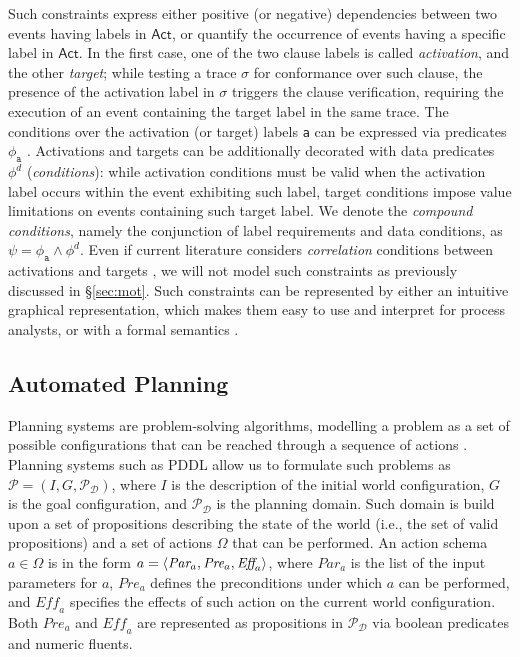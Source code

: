  Such constraints express either positive (or negative) dependencies between two events having labels in $\textsf{Act}$, or quantify the occurrence of events having a specific label in $\textsf{Act}$. In the first case, one of the two clause labels is called \textit{activation}, and the other \textit{target}; while testing a trace $\sigma$ for conformance over such clause, the presence of the activation label in $\sigma$ triggers the clause verification, requiring the execution of an event containing the target label in the same trace. The conditions over the activation (or target) labels \texttt{a} can be expressed via predicates $\phi_{\texttt{a}}$ \cite{SchonigCMM16,LenoDM18}. Activations and targets can be additionally decorated with  data predicates $\phi^d$ (\textit{conditions}): while activation conditions must be valid when the activation label occurs within the event exhibiting such label, target conditions impose value limitations on events containing such target label. We denote the \textit{compound conditions}, namely the conjunction of label requirements and data conditions, as $\psi=\phi_{\texttt{a}}\wedge \phi^d$.  Even if current literature  considers \textit{correlation} conditions between activations and targets \cite{SchonigCMM16}, we will not model such constraints as previously discussed in \S\ref{sec:mot}. Such constraints can be represented by either an intuitive graphical representation, which makes them easy to use and interpret for process analysts, or with a formal semantics \cite{LeoniMA12}.

\subsection{Automated Planning}\label{ssec:ap}
Planning systems are problem-solving algorithms, modelling a problem as a set of possible configurations that can be reached through a sequence of actions \cite{MaggiMCA18}. Planning systems such as PDDL allow us to formulate such problems as $\mathcal{P}=(I,G,\mathcal{P}_\mathcal
{D})$, where $I$ is the description of the initial world configuration, $G$ is the goal configuration, and $\mathcal{P}_\mathcal{D}$ is the planning domain. Such domain is build upon a set of propositions describing the state of the world (i.e., the set of valid propositions) and a set of actions $\Omega$ that can be performed. An action schema $a\in \Omega$ is in the form $a=\Braket{\textit{Par}_a,\textit{Pre}_a,\textit{Eff}_a}$, where $\textit{Par}_a$ is the list of the input parameters for $a$, $\textit{Pre}_a$ defines the preconditions under which $a$ can be performed, and $\textit{Eff}_a$ specifies the effects of such action on the current world configuration. Both  $\textit{Pre}_a$ and $\textit{Eff}_a$ are represented as propositions in $\mathcal{P}_\mathcal{D}$ via boolean predicates and numeric fluents.

